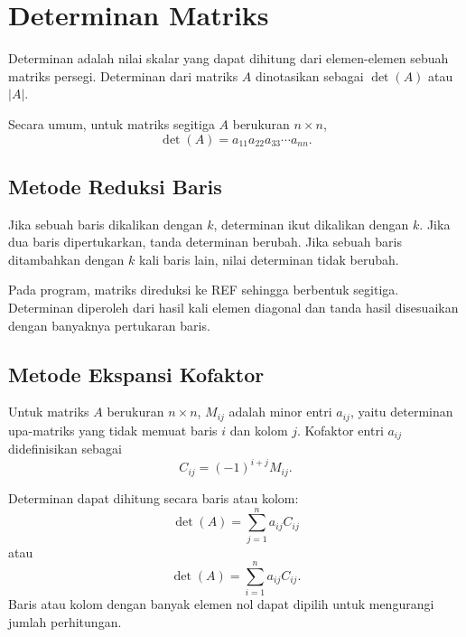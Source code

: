 \documentclass[12pt,a4paper]{report}
\begin{document}
\section{Determinan Matriks}

Determinan adalah nilai skalar yang dapat dihitung dari elemen-elemen sebuah matriks persegi. Determinan dari matriks $A$ dinotasikan sebagai $\det(A)$ atau $|A|$. \cite{tubes}

Secara umum, untuk matriks segitiga $A$ berukuran $n\times n$,
\begin{equation*}
\det(A)=a_{11}a_{22}a_{33}\cdots a_{nn}.
\end{equation*}
\cite{pakrin-det1}

\subsection{Metode Reduksi Baris}

Jika sebuah baris dikalikan dengan $k$, determinan ikut dikalikan dengan $k$. Jika dua baris dipertukarkan, tanda determinan berubah. Jika sebuah baris ditambahkan dengan $k$ kali baris lain, nilai determinan tidak berubah. \cite{pakrin-det1}

Pada program, matriks direduksi ke REF sehingga berbentuk segitiga. Determinan diperoleh dari hasil kali elemen diagonal dan tanda hasil disesuaikan dengan banyaknya pertukaran baris.

\subsection{Metode Ekspansi Kofaktor}

Untuk matriks $A$ berukuran $n\times n$, $M_{ij}$ adalah minor entri $a_{ij}$, yaitu determinan upa-matriks yang tidak memuat baris $i$ dan kolom $j$. Kofaktor entri $a_{ij}$ didefinisikan sebagai
\begin{equation*}
C_{ij}=(-1)^{i+j}M_{ij}.
\end{equation*}
\cite{pakrin-det2}

Determinan dapat dihitung secara baris atau kolom:
\begin{equation*}
\det(A)=\sum_{j=1}^{n}a_{ij}C_{ij}
\end{equation*}
atau
\begin{equation*}
\det(A)=\sum_{i=1}^{n}a_{ij}C_{ij}.
\end{equation*}
Baris atau kolom dengan banyak elemen nol dapat dipilih untuk mengurangi jumlah perhitungan. \cite{pakrin-det2}
\end{document}
